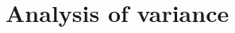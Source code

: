 \documentclass[10pt,a4paper]{article}
\begin{document}
\clearpage
\section{Analysis of variance}



\FloatBarrier
\end{document}
